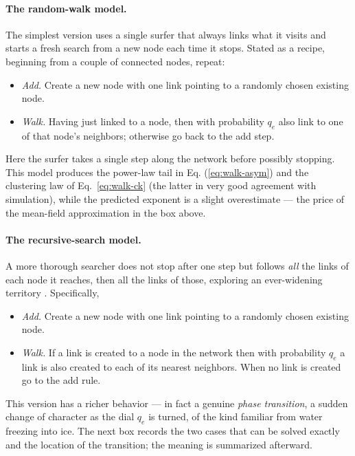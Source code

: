 \paragraph{The random-walk model.} The simplest version uses a single surfer
that always links what it visits and starts a fresh search from a new node each
time it stops. Stated as a recipe, beginning from a couple of connected nodes,
repeat:
\begin{itemize}
  \item \emph{Add.} Create a new node with one link pointing to a randomly
    chosen existing node.
  \item \emph{Walk.} Having just linked to a node, then with probability $q_e$
    also link to one of that node's neighbors; otherwise go back to the add
    step.
\end{itemize}
%
Here the surfer takes a single step along the network before possibly 
stopping. This model produces the power-law tail in Eq. (\ref{eq:walk-asym}) 
and the clustering law of Eq.~\eqref{eq:walk-ck} (the latter in very good 
agreement with simulation), while the predicted exponent is a slight 
overestimate --- the price of the mean-field approximation in the box above.

\paragraph{The recursive-search model.} A more thorough searcher does not 
stop after one step but follows \emph{all} the links of each node it reaches, 
then all the links of those, exploring an ever-widening territory 
\citep{vazquez2001}. Specifically,
%
\begin{itemize}
  \item \emph{Add.} Create a new node with one link pointing to a randomly
    chosen existing node.
  \item \emph{Walk.} If a link is created to a node in the network then
    with probability $q_e$ a link is also created to each of its nearest
    neighbors. When no link is created go to the add rule.
\end{itemize}
%
This version has a richer behavior --- in fact a genuine \emph{phase transition},
a sudden change of character as the dial $q_e$ is turned, of the kind familiar
from water freezing into ice. The next box records the two cases that can be
solved exactly and the location of the transition; the meaning is summarized
afterward.


